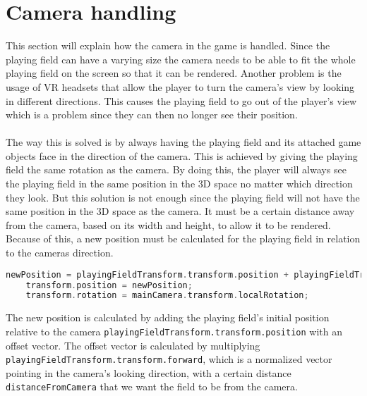 \section{Camera handling}
This section will explain how the camera in the game is handled.
Since the playing field can have a varying size the camera needs to be able to fit the whole playing field on the screen so that it can be rendered.
Another problem is the usage of VR headsets that allow the player to turn the camera's view by looking in different directions.
This causes the playing field to go out of the player's view which is a problem since they can then no longer see their position.
\\\\
The way this is solved is by always having the playing field and its attached game objects face in the direction of the camera.
This is achieved by giving the playing field the same rotation as the camera.
By doing this, the player will always see the playing field in the same position in the 3D space no matter which direction they look.
But this solution is not enough since the playing field will not have the same position in the 3D space as the camera.
It must be a certain distance away from the camera, based on its width and height, to allow it to be rendered. 
Because of this, a new position must be calculated for the playing field in relation to the cameras direction. 
\begin{lstlisting}[caption={Calculating and setting the position and rotation of the playing field}, captionpos=b,language=C,label={lst:camera_position}]
    newPosition = playingFieldTransform.transform.position + playingFieldTransform.transform.forward * distanceFromCamera;
    transform.position = newPosition;
    transform.rotation = mainCamera.transform.localRotation; 
\end{lstlisting}
The new position is calculated by adding the playing field's initial position relative to the camera \texttt{playingFieldTransform.transform.position} with an offset vector.
The offset vector is calculated by multiplying \texttt{playingFieldTransform.transform.forward}, which is a normalized vector pointing in the camera's looking direction, with a certain distance \texttt{distanceFromCamera} that we want the field to be from the camera.
